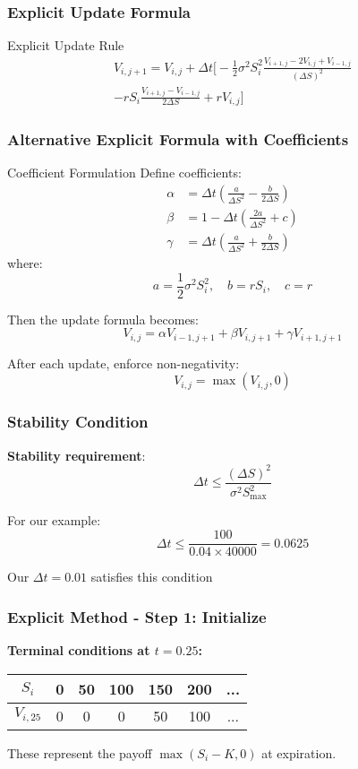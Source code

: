 \documentclass[aspectratio=169]{beamer}
\begin{document}
\begin{frame}
\frametitle{Explicit Update Formula}
\begin{block}{Explicit Update Rule}
\begin{multline}
V_{i,j+1} = V_{i,j} + \Delta t \bigg[ -\frac{1}{2}\sigma^2 S_i^2 \frac{V_{i+1,j} - 2V_{i,j} + V_{i-1,j}}{(\Delta S)^2} \\
- rS_i \frac{V_{i+1,j} - V_{i-1,j}}{2\Delta S} + rV_{i,j} \bigg]
\end{multline}
\end{block}
\end{frame}

\begin{frame}
\frametitle{Alternative Explicit Formula with Coefficients}
\begin{block}{Coefficient Formulation}
Define coefficients:
\begin{align*}
\alpha &= \Delta t \left(\frac{a}{\Delta S^2} - \frac{b}{2\Delta S}\right) \\
\beta &= 1 - \Delta t \left(\frac{2a}{\Delta S^2} + c\right) \\
\gamma &= \Delta t \left(\frac{a}{\Delta S^2} + \frac{b}{2\Delta S}\right)
\end{align*}
where:
\[a = \frac{1}{2}\sigma^2 S_i^2, \quad b = rS_i, \quad c = r\]

Then the update formula becomes:
\[V_{i,j} = \alpha V_{i-1,j+1} + \beta V_{i,j+1} + \gamma V_{i+1,j+1}\]
\end{block}

After each update, enforce non-negativity:
\[V_{i,j} = \max(V_{i,j}, 0)\]
\end{frame}

\begin{frame}
\frametitle{Stability Condition}
\textbf{Stability requirement}: 
\[\Delta t \leq \frac{(\Delta S)^2}{\sigma^2 S_{\max}^2}\]

For our example:
\[\Delta t \leq \frac{100}{0.04 \times 40000} = 0.0625\]

Our $\Delta t = 0.01$ satisfies this condition \checkmark
\end{frame}

\begin{frame}
\frametitle{Explicit Method - Step 1: Initialize}
\textbf{Terminal conditions at $t = 0.25$:}

\begin{center}
\begin{tabular}{c|c|c|c|c|c|c}
$S_i$ & 0 & 50 & 100 & 150 & 200 & ... \\
\hline
$V_{i,25}$ & 0 & 0 & 0 & 50 & 100 & ...
\end{tabular}
\end{center}

These represent the payoff $\max(S_i - K, 0)$ at expiration.
\end{frame}
\end{document}
